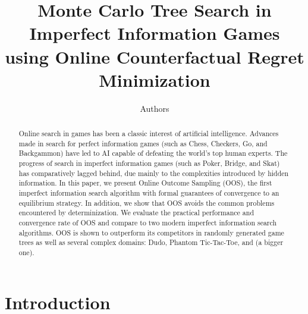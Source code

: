 \documentclass[letterpaper]{article}
\begin{document}
%
\title{Monte Carlo Tree Search in Imperfect Information Games\\using Online Counterfactual Regret Minimization}
\author{Authors}

\newcommand{\vlnote}[1]{{\scriptsize \color{blue} \refstepcounter{vlNoteCounter}\textsf{[VL]$_{\arabic{vlNoteCounter}}$:{#1}}}}

\maketitle

\begin{abstract}
Online search in games has been a classic interest of artificial intelligence.
Advances made in search for perfect information games (such as Chess, Checkers, Go, and Backgammon) have led to AI capable of defeating the world's top human experts. 
The progress of search in imperfect information games (such as Poker, Bridge, and Skat) has comparatively lagged behind, due mainly to the complexities introduced by hidden information. 
In this paper, we present Online Outcome Sampling (OOS), the first imperfect information search algorithm with formal guarantees of convergence to an equilibrium strategy.   
In addition, we show that OOS avoids the common problems encountered by determinization.
We evaluate the practical performance and convergence rate of OOS and compare to two modern imperfect information search algorithms.
OOS is shown to outperform its competitors in randomly generated game trees as well as several complex domains: 
Dudo, Phantom Tic-Tac-Toe, and (a bigger one). 
\end{abstract}

\section{Introduction}

\end{document}
